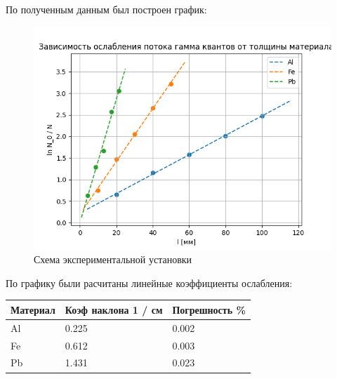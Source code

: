 \documentclass[a4paper,12pt]{article} %
\begin{document}
			По полученным данным был построен график:
			\begin{figure}[h!]
                \centering
                \includegraphics[width=15cm]{img/Graph.png}
                \caption{Схема экспериментальной установки}
                \label{graph1}
            \end{figure}
	\newpage
			По графику были расчитаны линейные коэффициенты ослабления:
			\begin{table}[h!]
				\centering
				\begin{tabular}{|l|l|l|}
				\hline
				Материал & Коэф наклона 1 / см & Погрешность \% \\ \hline
				Al       & 0.225               & 0.002          \\ \hline
				Fe       & 0.612               & 0.003          \\ \hline
				Pb       & 1.431               & 0.023          \\ \hline
				\end{tabular}
			\end{table}
			
	
\end{document}
